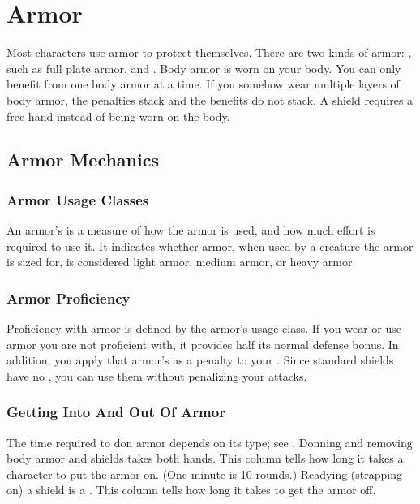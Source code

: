     

    

\newpage
\section{Armor}\label{Armor}

    Most characters use armor to protect themselves. There are two kinds of armor: , such as full plate armor, and .
    Body armor is worn on your body.
    You can only benefit from one body armor at a time.
    If you somehow wear multiple layers of body armor, the penalties stack and the benefits do not stack.
    A shield requires a free hand instead of being worn on the body.

    \subsection{Armor Mechanics}

        \subsubsection{Armor Usage Classes}\label{Armor Usage Classes}
            An armor's  is a measure of how the armor is used, and how much effort is required to use it.
            It indicates whether armor, when used by a creature the armor is sized for, is considered light armor, medium armor, or heavy armor.

        \subsubsection{Armor Proficiency}\label{Armor Proficiency}
            Proficiency with armor is defined by the armor's usage class.
            If you wear or use armor you are not proficient with, it provides half its normal defense bonus.
            In addition, you apply that armor's  as a penalty to your .
            Since standard shields have no , you can use them without penalizing your attacks.

        \subsubsection{Getting Into And Out Of Armor}
            The time required to don armor depends on its type; see . Donning and removing body armor and shields takes both hands.
             This column tells how long it takes a character to put the armor on. (One minute is 10 rounds.) Readying (strapping on) a shield is a .
             This column tells how long it takes to get the armor off.

